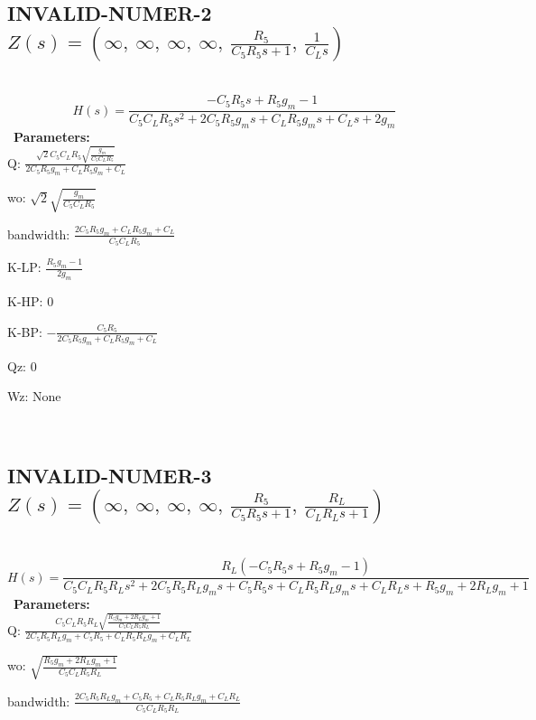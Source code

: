 \documentclass{article}
\begin{document}
\ 

\subsection{INVALID-NUMER-2 $Z(s) = \left( \infty, \  \infty, \  \infty, \  \infty, \  \frac{R_{5}}{C_{5} R_{5} s + 1}, \  \frac{1}{C_{L} s}\right)$ } \ 
\textbf{\[H(s) = \frac{- C_{5} R_{5} s + R_{5} g_{m} - 1}{C_{5} C_{L} R_{5} s^{2} + 2 C_{5} R_{5} g_{m} s + C_{L} R_{5} g_{m} s + C_{L} s + 2 g_{m}}\] } \ 
\textbf{Parameters:}\\ 

Q: $\frac{\sqrt{2} C_{5} C_{L} R_{5} \sqrt{\frac{g_{m}}{C_{5} C_{L} R_{5}}}}{2 C_{5} R_{5} g_{m} + C_{L} R_{5} g_{m} + C_{L}}$\ 

wo: $\sqrt{2} \sqrt{\frac{g_{m}}{C_{5} C_{L} R_{5}}}$\ 

bandwidth: $\frac{2 C_{5} R_{5} g_{m} + C_{L} R_{5} g_{m} + C_{L}}{C_{5} C_{L} R_{5}}$\ 

K-LP: $\frac{R_{5} g_{m} - 1}{2 g_{m}}$\ 

K-HP: $0$\ 

K-BP: $- \frac{C_{5} R_{5}}{2 C_{5} R_{5} g_{m} + C_{L} R_{5} g_{m} + C_{L}}$\ 

Qz: $0$\ 

Wz: $\text{None}$\ 

\ 

\subsection{INVALID-NUMER-3 $Z(s) = \left( \infty, \  \infty, \  \infty, \  \infty, \  \frac{R_{5}}{C_{5} R_{5} s + 1}, \  \frac{R_{L}}{C_{L} R_{L} s + 1}\right)$ } \ 
\textbf{\[H(s) = \frac{R_{L} \left(- C_{5} R_{5} s + R_{5} g_{m} - 1\right)}{C_{5} C_{L} R_{5} R_{L} s^{2} + 2 C_{5} R_{5} R_{L} g_{m} s + C_{5} R_{5} s + C_{L} R_{5} R_{L} g_{m} s + C_{L} R_{L} s + R_{5} g_{m} + 2 R_{L} g_{m} + 1}\] } \ 
\textbf{Parameters:}\\ 

Q: $\frac{C_{5} C_{L} R_{5} R_{L} \sqrt{\frac{R_{5} g_{m} + 2 R_{L} g_{m} + 1}{C_{5} C_{L} R_{5} R_{L}}}}{2 C_{5} R_{5} R_{L} g_{m} + C_{5} R_{5} + C_{L} R_{5} R_{L} g_{m} + C_{L} R_{L}}$\ 

wo: $\sqrt{\frac{R_{5} g_{m} + 2 R_{L} g_{m} + 1}{C_{5} C_{L} R_{5} R_{L}}}$\ 

bandwidth: $\frac{2 C_{5} R_{5} R_{L} g_{m} + C_{5} R_{5} + C_{L} R_{5} R_{L} g_{m} + C_{L} R_{L}}{C_{5} C_{L} R_{5} R_{L}}$\ 
\end{document}
